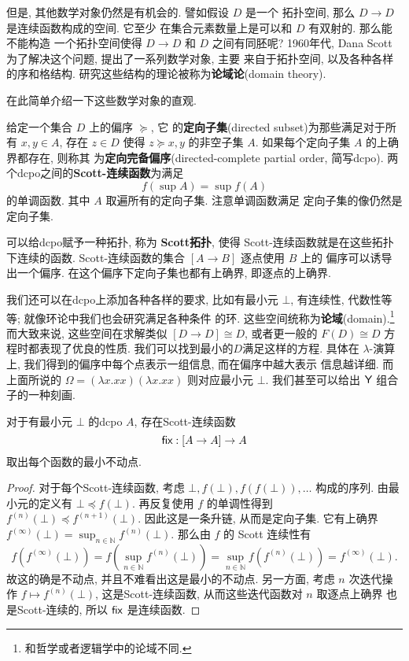 但是, 其他数学对象仍然是有机会的. 譬如假设 \(D\) 是一个
拓扑空间, 那么 \(D \to D\) 是连续函数构成的空间. 它至少
在集合元素数量上是可以和 \(D\) 有双射的. 那么能不能构造
一个拓扑空间使得 \(D \to D\) 和 \(D\) 之间有同胚呢?
1960年代, Dana Scott 为了解决这个问题, 提出了一系列数学对象, 主要
来自于拓扑空间, 以及各种各样的序和格结构.
研究这些结构的理论被称为\textbf{论域论}(domain theory).

在此简单介绍一下这些数学对象的直观.
\begin{definition}
给定一个集合 \(D\) 上的偏序 \(\succeq\), 它
的\textbf{定向子集}(directed subset)为那些满足对于所有 \(x,y\in A\),
存在 \(z \in D\) 使得 \(z \succeq x, y\) 的非空子集
\(A\). 如果每个定向子集 \(A\) 的上确界都存在, 则称其
为\textbf{定向完备偏序}(directed-complete partial order, 简写dcpo).
两个dcpo之间的\textbf{Scott-连续函数}为满足
\[f\left(\sup A\right) = \sup f(A)\]
的单调函数. 其中 \(A\) 取遍所有的定向子集. 注意单调函数满足
定向子集的像仍然是定向子集.
\end{definition}
可以给dcpo赋予一种拓扑, 称为 \textbf{Scott拓扑},
使得 Scott-连续函数就是在这些拓扑下连续的函数.
Scott-连续函数的集合 \([A \to B]\) 逐点使用 \(B\) 上的
偏序可以诱导出一个偏序. 在这个偏序下定向子集也都有上确界,
即逐点的上确界.

我们还可以在dcpo上添加各种各样的要求, 比如有最小元 \(\bot\),
有连续性, 代数性等等; 就像环论中我们也会研究满足各种条件
的环. 这些空间统称为\textbf{论域}(domain).\footnote{和哲学或者逻辑学中的论域不同.}
而大致来说, 这些空间在求解类似 \([D \to D] \cong D\),
或者更一般的 \(F(D) \cong D\) 方程时都表现了优良的性质.
我们可以找到最小的\(D\)满足这样的方程. 具体在 \(\lambda\)-演算
上, 我们得到的偏序中每个点表示一组信息, 而在偏序中越大表示
信息越详细. 而上面所说的 \(\Omega = (\lambda x. xx) (\lambda x.xx)\)
则对应最小元 \(\bot\). 我们甚至可以给出 \(\textsf{Y}\)
组合子的一种刻画.
\begin{lemma}
对于有最小元 \(\bot\) 的dcpo \(A\),
存在Scott-连续函数
\emph{\[\textsf{fix} : [A \to A] \to A\]}
取出每个函数的最小不动点.
\end{lemma}
\begin{proof}
对于每个Scott-连续函数,
考虑 \(\bot, f(\bot), f(f(\bot)),\dots\) 构成的序列.
由最小元的定义有 \(\bot \preceq f(\bot)\). 再反复使用
\(f\) 的单调性得到 \(f^{(n)}(\bot) \preceq f^{(n+1)}(\bot)\).
因此这是一条升链, 从而是定向子集. 它有上确界
\(f^{(\infty)}(\bot) = \sup_{n\in\mathbb N}f^{(n)}(\bot).\)
那么由 \(f\) 的 Scott 连续性有
\[f(f^{(\infty)}(\bot)) = f(\sup_{n\in\mathbb N}f^{(n)}(\bot))
= \sup_{n\in\mathbb N} f(f^{(n)}(\bot)) = f^{(\infty)}(\bot).\]
故这的确是不动点, 并且不难看出这是最小的不动点.
另一方面, 考虑 \(n\) 次迭代操作 \(f \mapsto f^{(n)}(\bot)\),
这是Scott-连续函数, 从而这些迭代函数对 \(n\) 取逐点上确界
也是Scott-连续的, 所以 \(\textsf{fix}\) 是连续函数.
\end{proof}

